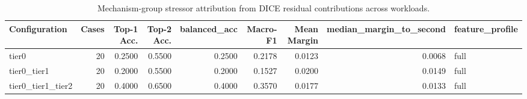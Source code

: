 \begin{table}[t]
\centering
\caption{Mechanism-group stressor attribution from DICE residual contributions across workloads.}
\label{tab:dice_stressor_diagnosis}
\footnotesize
\begin{tabular}{lrrrrrrrl}
\toprule
Configuration & Cases & Top-1 Acc. & Top-2 Acc. & balanced_acc & Macro-F1 & Mean Margin & median_margin_to_second & feature_profile \\
\midrule
tier0 & 20 & 0.2500 & 0.5500 & 0.2500 & 0.2178 & 0.0123 & 0.0068 & full \\
tier0_tier1 & 20 & 0.2000 & 0.5500 & 0.2000 & 0.1527 & 0.0200 & 0.0149 & full \\
tier0_tier1_tier2 & 20 & 0.4000 & 0.6500 & 0.4000 & 0.3570 & 0.0177 & 0.0133 & full \\
\bottomrule
\end{tabular}

\end{table}
